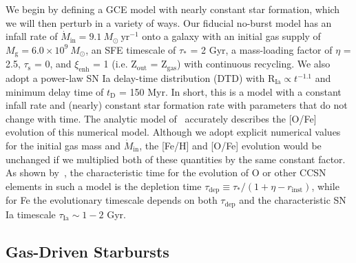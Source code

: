 We begin by defining a GCE model with nearly constant star formation, which we 
will then perturb in a variety of ways. Our fiducial no-burst model has an 
infall rate of $\dot{M}_\text{in} = 9.1\ M_\odot\ \text{yr}^{-1}$ onto a galaxy 
with an initial gas supply of $M_\text{g} = 6.0\times10^9\ M_\odot$, an SFE 
timescale of $\tau_*$ = 2 Gyr, a mass-loading factor of $\eta$ = 2.5, 
$\tau_\text{s}$ = 0, and $\xi_\text{enh}$ = 1 (i.e. Z$_\text{out}$ = 
Z$_\text{gas}$) with continuous recycling. We also adopt a power-law SN Ia 
delay-time distribution (DTD) with R$_\text{Ia} \propto t^{-1.1}$ and minimum 
delay time of $t_\text{D}$ = 150 Myr. In short, this is a model with a 
constant infall rate and (nearly) constant star formation rate with parameters 
that do not change with time. The analytic model of~\citet{Weinberg2017b} 
accurately describes the [O/Fe] evolution of this numerical model. Although we 
adopt explicit numerical values for the initial gas mass and 
$\dot{M}_\text{in}$, the [Fe/H] and [O/Fe] evolution would be unchanged if we 
multiplied both of these quantities by the same constant factor. As shown 
by~\citet{Weinberg2017b}, the characteristic time for the evolution of O 
or other CCSN elements in such a model is the depletion time 
$\tau_\text{dep} \equiv \tau_*/(1 + \eta - r_\text{inst})$, while for Fe the 
evolutionary timescale depends on both $\tau_\text{dep}$ and the characteristic 
SN Ia timescale $\tau_\text{Ia}\sim 1-2$ Gyr. 

\subsection{Gas-Driven Starbursts}
\label{bursts:sec:gas-driven}


